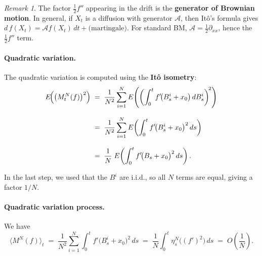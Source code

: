 \documentclass[11pt]{article}
\theoremstyle{definition}
\theoremstyle{remark}
\newtheorem{remark}{Remark}
\begin{document}
\begin{remark}
The factor $\tfrac{1}{2}f''$ appearing in the drift is the
\textbf{generator of Brownian motion}.  In general, if $X_t$
is a diffusion with generator $\mathcal{A}$, then It\^o's formula
gives $d\,f(X_t) = \mathcal{A}f(X_t)\,dt + \text{(martingale)}$.
For standard BM, $\mathcal{A} = \tfrac{1}{2}\partial_{xx}$,
hence the $\tfrac{1}{2}f''$ term.
\end{remark}

\paragraph{Quadratic variation.}


The quadratic variation is computed using the \textbf{Itô isometry}:
\begin{align*}
    E\!\Bigl(\bigl(M_t^N(f)\bigr)^2\Bigr)
    &\;=\;
    \frac{1}{N^2}\sum_{i=1}^{N}
    E\!\left(
        \left(\int_0^t f'\!\bigl(B_s^i + x_0\bigr)\,dB_s^i
        \right)^{\!2}
    \right) \\[8pt]
    &\;=\;
    \frac{1}{N^2}\sum_{i=1}^{N}
    E\!\left(
        \int_0^t
        f'\!\bigl(B_s^i + x_0\bigr)^2\,ds
    \right) \\[8pt]
    &\;=\;
    \frac{1}{N}\;
    E\!\left(
        \int_0^t
        f'\!\bigl(B_s + x_0\bigr)^2\,ds
    \right).
\end{align*}


In the last step, we used that the $B^i$ are i.i.d.,
so all $N$ terms are equal, giving a factor $1/N$.

\paragraph{Quadratic variation process.}


We have
\[
    \bigl\langle M^N(f) \bigr\rangle_t
    \;=\;
    \frac{1}{N^2}\sum_{i=1}^{N}
    \int_0^t f'\!\bigl(B_s^i + x_0\bigr)^2\,ds
    \;=\;
    \frac{1}{N}
    \int_0^t \eta_s^N\!\bigl((f')^2\bigr)\,ds
    \;=\;
    O\!\left(\frac{1}{N}\right).
\]
\end{document}
